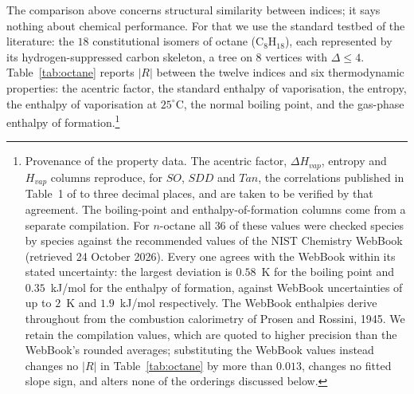 \documentclass[11pt,a4paper]{article}
\theoremstyle{plain}
\theoremstyle{definition}
\theoremstyle{remark}
\begin{document}
The comparison above concerns structural similarity between indices; it says
nothing about chemical performance. For that we use the standard testbed of the
literature: the $18$ constitutional isomers of octane ($\mathrm{C_8H_{18}}$),
each represented by its hydrogen-suppressed carbon skeleton, a tree on $8$
vertices with $\Delta\le4$. Table~\ref{tab:octane} reports $|R|$ between the
twelve indices and six thermodynamic properties: the acentric factor, the
standard enthalpy of vaporisation, the entropy, the enthalpy of vaporisation at
$25^\circ$C, the normal boiling point, and the gas-phase enthalpy of
formation.\footnote{Provenance of the property data. The acentric factor,
$\Delta H_{vap}$, entropy and $H_{vap}$ columns reproduce, for $SO$, $SDD$ and
$Tan$, the correlations published in Table~1 of \cite{oz2025} to three decimal
places, and are taken to be verified by that agreement. The boiling-point and
enthalpy-of-formation columns come from a separate compilation. For $n$-octane
all $36$ of these values were checked species by species against the recommended
values of the NIST Chemistry WebBook \cite{nist} (retrieved 24 October 2026).
Every one agrees with the WebBook within its stated uncertainty: the largest
deviation is $0.58$~K for the boiling point and $0.35$~kJ/mol for the enthalpy of
formation, against WebBook uncertainties of up to $2$~K and $1.9$~kJ/mol
respectively. The WebBook enthalpies derive throughout from the combustion
calorimetry of Prosen and Rossini, 1945. We retain the compilation values, which
are quoted to higher precision than the WebBook's rounded averages; substituting
the WebBook values instead changes no $|R|$ in Table~\ref{tab:octane} by more
than $0.013$, changes no fitted slope sign, and alters none of the orderings
discussed below.}
\end{document}
